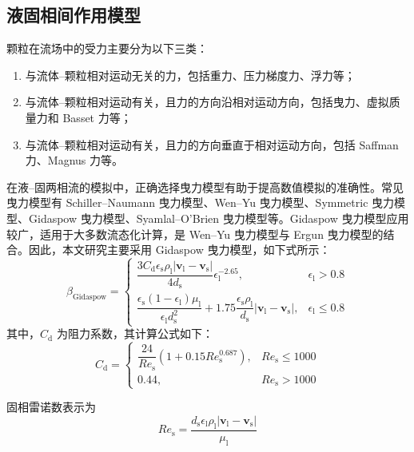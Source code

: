 \subsection{液固相间作用模型}

颗粒在流场中的受力主要分为以下三类：
\begin{enumerate}
	\item 与流体--颗粒相对运动无关的力，包括重力、压力梯度力、浮力等；
	\item 与流体--颗粒相对运动有关，且力的方向沿相对运动方向，包括曳力、虚拟质量力和 Basset 力等；
	\item 与流体--颗粒相对运动有关，且力的方向垂直于相对运动方向，包括 Saffman 力、Magnus 力等。
\end{enumerate}

在液--固两相流的模拟中，正确选择曳力模型有助于提高数值模拟的准确性。常见曳力模型有 Schiller--Naumann 曳力模型、Wen--Yu 曳力模型、Symmetric 曳力模型、Gidaspow 曳力模型、Syamlal--O'Brien 曳力模型等。Gidaspow 曳力模型应用较广，适用于大多数流态化计算，是 Wen--Yu 曳力模型与 Ergun 曳力模型的结合。因此，本文研究主要采用 Gidaspow 曳力模型，如下式所示：
\begin{equation}
	\beta_{\mathrm{Gidaspow}}=
	\begin{cases}
		\dfrac{3C_{\mathrm{d}}\epsilon_{\mathrm{s}}\rho_{\mathrm{l}}\left|\bm{v}_{\mathrm{l}}-\bm{v}_{\mathrm{s}}\right|}{4d_{\mathrm{s}}}\epsilon_{\mathrm{l}}^{-2.65}, & \epsilon_{\mathrm{l}}>0.8 \\[10pt]
		\dfrac{\epsilon_{\mathrm{s}}(1-\epsilon_{\mathrm{l}})\mu_{\mathrm{l}}}{\epsilon_{\mathrm{l}}d_{\mathrm{s}}^{2}}
		+1.75\dfrac{\epsilon_{\mathrm{s}}\rho_{\mathrm{l}}}{d_{\mathrm{s}}}
		\left|\bm{v}_{\mathrm{l}}-\bm{v}_{\mathrm{s}}\right|, & \epsilon_{\mathrm{l}}\leq 0.8
	\end{cases}
\end{equation}
其中，\(C_{\mathrm{d}}\) 为阻力系数，其计算公式如下：
\begin{equation}
	C_{\mathrm{d}}=
	\begin{cases}
		\dfrac{24}{Re_{\mathrm{s}}}\left(1+0.15Re_{\mathrm{s}}^{0.687}\right), & Re_{\mathrm{s}}\leq 1000 \\[8pt]
		0.44, & Re_{\mathrm{s}}>1000
	\end{cases}
\end{equation}

固相雷诺数表示为
\begin{equation}
	Re_{\mathrm{s}}=\frac{d_{\mathrm{s}}\epsilon_{\mathrm{l}}\rho_{\mathrm{l}}
		\left|\bm{v}_{\mathrm{l}}-\bm{v}_{\mathrm{s}}\right|}{\mu_{\mathrm{l}}}
\end{equation}

